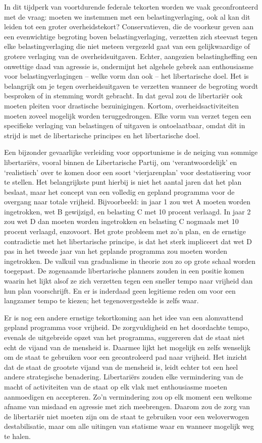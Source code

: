 \documentclass[
  a5paper,
  smalldemyvopaper,10pt,twoside,onecolumn,openright,extrafontsizes,hidelinks]{memoir}
\begin{document}
In dit tijdperk van voortdurende federale tekorten worden we vaak
geconfronteerd met de vraag: moeten we instemmen met een
belastingverlaging, ook al kan dit leiden tot een groter
overheidstekort? Conservatieven, die de voorkeur geven aan een
evenwichtige begroting boven belastingverlaging, verzetten zich steevast
tegen elke belastingverlaging die niet meteen vergezeld gaat van een
gelijkwaardige of grotere verlaging van de overheidsuitgaven. Echter,
aangezien belastingheffing een onwettige daad van agressie is,
ondermijnt het algehele gebrek aan enthousiasme voor
belastingverlagingen -- welke vorm dan ook -- het libertarische doel.
Het is belangrijk om je tegen overheidsuitgaven te verzetten wanneer de
begroting wordt besproken of in stemming wordt gebracht. In dat geval
zou de libertariër ook moeten pleiten voor drastische bezuinigingen.
Kortom, overheidsactiviteiten moeten zoveel mogelijk worden
teruggedrongen. Elke vorm van verzet tegen een specifieke verlaging van
belastingen of uitgaven is ontoelaatbaar, omdat dit in strijd is met de
libertarische principes en het libertarische doel.

Een bijzonder gevaarlijke verleiding voor opportunisme is de neiging van
sommige libertariërs, vooral binnen de Libertarische Partij, om
`verantwoordelijk' en `realistisch' over te komen door een soort
`vierjarenplan' voor destatisering voor te stellen. Het belangrijkste
punt hierbij is niet het aantal jaren dat het plan beslaat, maar het
concept van een volledig en gepland programma voor de overgang naar
totale vrijheid. Bijvoorbeeld: in jaar 1 zou wet A moeten worden
ingetrokken, wet B gewijzigd, en belasting C met 10 procent verlaagd. In
jaar 2 zou wet D dan moeten worden ingetrokken en belasting C nogmaals
met 10 procent verlaagd, enzovoort. Het grote probleem met zo'n plan, en
de ernstige contradictie met het libertarische principe, is dat het
sterk impliceert dat wet D pas in het tweede jaar van het geplande
programma zou moeten worden ingetrokken. De valkuil van gradualisme in
theorie zou zo op grote schaal worden toegepast. De zogenaamde
libertarische planners zouden in een positie komen waarin het lijkt
alsof ze zich verzetten tegen een sneller tempo naar vrijheid dan hun
plan voorschrijft. En er is inderdaad geen legitieme reden om voor een
langzamer tempo te kiezen; het tegenovergestelde is zelfs waar.

Er is nog een andere ernstige tekortkoming aan het idee van een
alomvattend gepland programma voor vrijheid. De zorgvuldigheid en het
doordachte tempo, evenals de uitgebreide opzet van het programma,
suggereren dat de staat niet echt de vijand van de mensheid is. Daarmee
lijkt het mogelijk en zelfs wenselijk om de staat te gebruiken voor een
gecontroleerd pad naar vrijheid. Het inzicht dat de staat de grootste
vijand van de mensheid is, leidt echter tot een heel andere strategische
benadering. Libertariërs zouden elke vermindering van de macht of
activiteiten van de staat op elk vlak met enthousiasme moeten
aanmoedigen en accepteren. Zo'n vermindering zou op elk moment een
welkome afname van misdaad en agressie met zich meebrengen. Daarom zou
de zorg van de libertariër niet moeten zijn om de staat te gebruiken
voor een weloverwogen destabilisatie, maar om alle uitingen van statisme
waar en wanneer mogelijk weg te halen.
\end{document}
